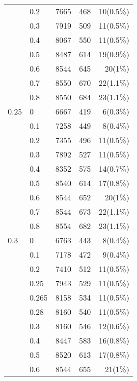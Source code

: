 \begin{center}
\begin{longtable}{llrrr}
                      & 0.2   & 7665 & 468 & 10(0.5\%) \\
                      & 0.3   & 7919 & 509 & 11(0.5\%) \\
                      & 0.4   & 8067 & 550 & 11(0.5\%) \\
                      & 0.5   & 8487 & 614 & 19(0.9\%) \\
                      & 0.6   & 8544 & 645 & 20(1\%)   \\
                      & 0.7   & 8550 & 670 & 22(1.1\%) \\
                      & 0.8   & 8550 & 684 & 23(1.1\%) \\ \hline
                    0.25 & 0     & 6667 & 419 & 6(0.3\%)  \\
                      & 0.1   & 7258 & 449 & 8(0.4\%)  \\
                      & 0.2   & 7355 & 496 & 11(0.5\%) \\
                      & 0.3   & 7892 & 527 & 11(0.5\%) \\
                      & 0.4   & 8352 & 575 & 14(0.7\%) \\
                      & 0.5   & 8540 & 614 & 17(0.8\%) \\
                      & 0.6   & 8544 & 652 & 20(1\%)   \\
                      & 0.7   & 8544 & 673 & 22(1.1\%) \\
                      & 0.8   & 8554 & 682 & 23(1.1\%) \\ \hline
                    0.3 & 0     & 6763 & 443 & 8(0.4\%)  \\
                      & 0.1   & 7178 & 472 & 9(0.4\%)  \\
                      & 0.2   & 7410 & 512 & 11(0.5\%) \\
                      & 0.25  & 7943 & 529 & 11(0.5\%) \\
                      & 0.265 & 8158 & 534 & 11(0.5\%) \\
                      & 0.28  & 8160 & 540 & 11(0.5\%) \\
                      & 0.3   & 8160 & 546 & 12(0.6\%) \\
                      & 0.4   & 8447 & 583 & 16(0.8\%) \\
                      & 0.5   & 8520 & 613 & 17(0.8\%) \\
                      & 0.6   & 8544 & 655 & 21(1\%)   \\

\end{longtable}
\end{center}
